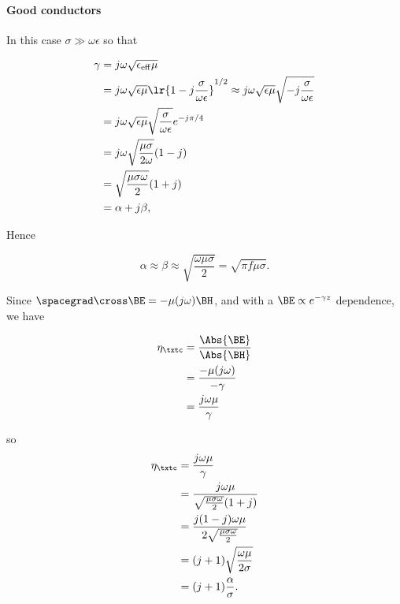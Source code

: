 \paragraph{Good conductors}

In this case \( \sigma \gg \omega \epsilon \) so that

\begin{equation}\label{eqn:uwavesLecture3:420}
\begin{aligned}
\gamma
&=
j \omega \sqrt{ \epsilon_{\mathrm{eff}} \mu }
\\ &=
j \omega \sqrt{ \epsilon \mu } \lr{ 1 - j \frac{\sigma}{\omega \epsilon} }^{1/2}
\approx
j \omega \sqrt{ \epsilon \mu } \sqrt{- j \frac{\sigma}{\omega \epsilon} }
\\ &=
j \omega \sqrt{ \epsilon \mu } \sqrt{\frac{\sigma}{\omega \epsilon} } e^{-j \pi/4}
\\ &=
j \omega \sqrt{ \frac{ \mu \sigma}{2 \omega} } ( 1 - j )
\\ &=
\sqrt{ \frac{ \mu \sigma \omega}{2 } } ( 1 + j )
\\ &= \alpha + j \beta,
\end{aligned}
\end{equation}

Hence

\begin{equation}\label{eqn:uwavesLecture3:440}
\alpha \approx \beta \approx \sqrt{\frac{\omega \mu \sigma}{2}} = \sqrt{ \pi f \mu \sigma }.
\end{equation}

Since \( \spacegrad \cross \BE = - \mu (j \omega) \BH \), and with a \( \BE \propto e^{-\gamma z } \) dependence, we have

\begin{equation}\label{eqn:uwavesLecture3:480}
\begin{aligned}
\eta_\txtc &= \frac{\Abs{\BE}}{\Abs{\BH}} \\ &= \frac{- \mu (j \omega)}{-\gamma} \\ &= \frac{j \omega \mu}{\gamma}
\end{aligned}
\end{equation}

so
\begin{equation}\label{eqn:uwavesLecture3:460}
\begin{aligned}
\eta_\txtc
&=
\frac{j \omega \mu}{ \gamma}
\\ &=
\frac{j \omega \mu}{
\sqrt{ \frac{ \mu \sigma \omega}{2 } } ( 1 + j )
}
\\ &=
\frac{j (1 - j ) \omega \mu}{
2 \sqrt{ \frac{ \mu \sigma \omega}{2 } }
}
\\ &=
(j + 1) \sqrt{ \frac{ \omega \mu }{ 2 \sigma} }
\\ &=
(j + 1) \frac{\alpha}{\sigma}.
\end{aligned}
\end{equation}

